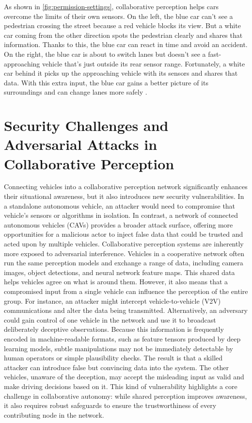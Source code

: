 As shown in \autoref{fig:permission-settings}, collaborative perception helps cars overcome the limits of their own sensors.
On the left, the blue car can’t see a pedestrian crossing the street because a red vehicle blocks its view. But a white car coming from the other direction spots the pedestrian clearly and shares that information. Thanks to this, the blue car can react in time and avoid an accident.
On the right, the blue car is about to switch lanes but doesn’t see a fast-approaching vehicle that’s just outside its rear sensor range. Fortunately, a white car behind it picks up the approaching vehicle with its sensors and shares that data. With this extra input, the blue car gains a better picture of its surroundings and can change lanes more safely \cite{hu2025collaborativeperceptionconnectedautonomous}.

\section{Security Challenges and Adversarial Attacks in Collaborative Perception}

Connecting vehicles into a collaborative perception network significantly enhances their situational awareness, but it also introduces new security vulnerabilities.
In a standalone autonomous vehicle, an attacker would need to compromise that vehicle’s sensors or algorithms in isolation.
In contrast, a network of connected autonomous vehicles (CAVs) provides a broader attack surface, offering more opportunities for a malicious actor to inject false data that could be trusted and acted upon by multiple vehicles.
Collaborative perception systems are inherently more exposed to adversarial interference. Vehicles in a cooperative network often run the same perception models and exchange a range of data, including camera images, object detections, and neural network feature maps.
This shared data helps vehicles agree on what is around them. However, it also means that a compromised input from a single vehicle can influence the perception of the entire group.
For instance, an attacker might intercept vehicle-to-vehicle (V2V) communications and alter the data being transmitted. Alternatively, an adversary could gain control of one vehicle in the network and use it to broadcast deliberately deceptive observations.
Because this information is frequently encoded in machine-readable formats, such as feature tensors produced by deep learning models, subtle manipulations may not be immediately detectable by human operators or simple plausibility checks.
The result is that a skilled attacker can introduce false but convincing data into the system. The other vehicles, unaware of the deception, may accept the misleading input as valid and make driving decisions based on it.
This kind of vulnerability highlights a core challenge in collaborative autonomy: while shared perception improves awareness, it also requires robust safeguards to ensure the trustworthiness of every contributing node in the network.

